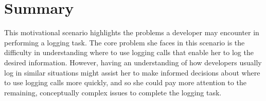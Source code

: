 

\section{Summary}  \label{ch2-summary}

This motivational scenario highlights the problems a developer may encounter in performing a logging task.
The core problem she faces in this scenario is the difficulty in understanding where to use logging calls that enable her to log the desired information. However, having an understanding of how developers usually log in similar situations might assist her to make informed decisions about where to use logging calls more quickly, and so she could pay more attention to the remaining, conceptually complex issues to complete the logging task.


